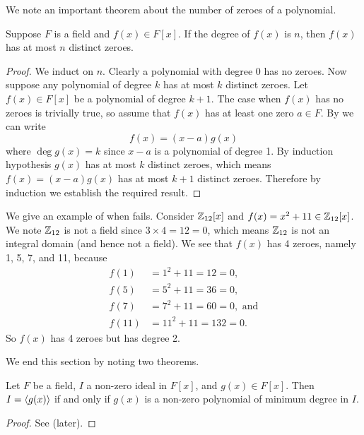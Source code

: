 We note an important theorem about the number of zeroes of a polynomial.
\begin{theorem}\label{thrm-polynomial-of-degree-n-has-at-most-n-zeroes}
    Suppose $F$ is a field and $f(x) \in F[x]$. If the degree of $f(x)$ is $n$, then $f(x)$ has at most $n$ distinct zeroes.
\end{theorem}
\begin{proof}
    We induct on $n$. Clearly a polynomial with degree 0 has no zeroes. Now suppose any polynomial of degree $k$ has at most $k$ distinct zeroes. Let $f(x) \in F[x]$ be a polynomial of degree $k + 1$. The case when $f(x)$ has no zeroes is trivially true, so assume that $f(x)$ has at least one zero $a \in F$. By  we can write
    \[
        f(x) = (x-a)g(x)
    \]
    where $\deg g(x) = k$ since $x-a$ is a polynomial of degree 1. By induction hypothesis $g(x)$ has at most $k$ distinct zeroes, which means $f(x) = (x-a)g(x)$ has at most $k + 1$ distinct zeroes. Therefore by induction we establish the required result.
\end{proof}

\begin{example}
    We give an example of when  fails. Consider $\mathbb{Z}_{12}[x]$ and $f(x) = x^2 + 11 \in \mathbb{Z}_{12}[x]$. We note $\mathbb{Z}_{12}$ is not a field since $3 \times 4 = 12 = 0$, which means $\mathbb{Z}_{12}$ is not an integral domain (and hence not a field). We see that $f(x)$ has 4 zeroes, namely 1, 5, 7, and 11, because
    \begin{align*}
        f(1) &= 1^2 + 11 = 12 = 0,\\
        f(5) &= 5^2 + 11 = 36 = 0,\\
        f(7) &= 7^2 + 11 = 60 = 0, \text{ and}\\
        f(11) &= 11^2 + 11 = 132 = 0.
    \end{align*}
    So $f(x)$ has 4 zeroes but has degree 2.
\end{example}

We end this section by noting two theorems.
\begin{theorem}\label{thrm-criterion-for-principal-ideal-in-polynomial-field}
    Let $F$ be a field, $I$ a non-zero ideal in $F[x]$, and $g(x) \in F[x]$. Then $I = \left\langle g(x)\right\rangle$ if and only if $g(x)$ is a non-zero polynomial of minimum degree in $I$.
\end{theorem}
\begin{proof}
    See  (later).
\end{proof}

